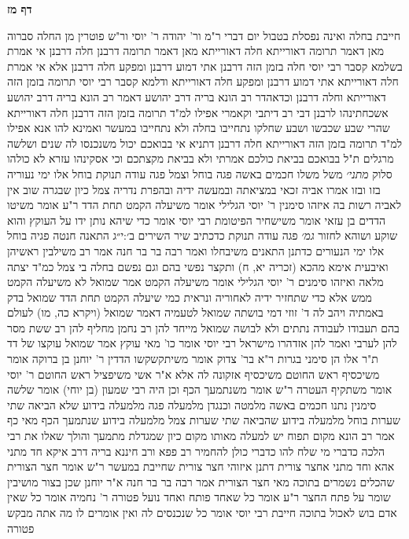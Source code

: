 \documentclass[12pt, openany]{book}
\newcommand{\sethebfont}{
\fontsize{10.5pt}{21.0pt} \selectfont
}
\newcommand{\twocol}[1]{
	{\sethebfont \begin{multicols}{2}
			#1
	\end{multicols}}	
}
\newcommand{\sectname}{}
\newcommand{\newsection}[1]{
	\addcontentsline{toc}{section}{#1}
	\renewcommand{\sectname}{#1}	
	\vspace{-\baselineskip}
	\begin{center}
		\textbf{%
\fontsize{16pt}{16pt}\selectfont
			#1}
	\end{center}
	\vspace{-\baselineskip}
	\nopagebreak
}
\begin{document}
\newsection{דף מז}
\twocol{חייבת בחלה ואינה נפסלת בטבול יום דברי ר"מ ור' יהודה ר' יוסי ור"ש פוטרין מן החלה 
סברוה מאן דאמר תרומה דאורייתא חלה דאורייתא מאן דאמר תרומה דרבנן חלה דרבנן אי אמרת בשלמא קסבר רבי יוסי חלה בזמן הזה דרבנן אתי דמוע דרבנן ומפקע חלה דרבנן 
אלא אי אמרת חלה דאורייתא אתי דמוע דרבנן ומפקע חלה דאורייתא 
ודלמא קסבר רבי יוסי תרומה בזמן הזה דאורייתא וחלה דרבנן 
וכדאהדר רב הונא בריה דרב יהושע דאמר רב הונא בריה דרב יהושע אשכחתינהו לרבנן דבי רב דיתבי וקאמרי אפילו למ"ד תרומה בזמן הזה דרבנן חלה דאורייתא
שהרי שבע שכבשו ושבע שחלקו נתחייבו בחלה ולא נתחייבו במעשר 
ואמינא להו אנא אפילו למ"ד תרומה בזמן הזה דאורייתא חלה דרבנן דתניא אי בבואכם יכול משנכנסו לה שנים ושלשה מרגלים ת"ל בבואכם בביאת כולכם אמרתי ולא בביאת מקצתכם
וכי אסקינהו עזרא לא כולהו סלוק
{\large\emph{מתני׳}} משל משלו חכמים באשה פגה בוחל וצמל פגה עודה תנוקת בוחל אלו ימי נעוריה
בזו ובזו אמרו אביה זכאי במציאתה ובמעשה ידיה ובהפרת נדריה צמל כיון שבגרה שוב אין לאביה רשות בה 
איזהו סימנין ר' יוסי הגלילי אומר משיעלה הקמט תחת הדד ר"ע אומר משיטו הדדים בן עזאי אומר משישחיר הפיטומת רבי יוסי אומר כדי שיהא נותן ידו על העוקץ והוא שוקע ושוהא לחזור
{\large\emph{גמ׳}} פגה עודה תנוקת כדכתיב {שיר השירים ב׳:י״ג } התאנה חנטה פגיה בוחל אלו ימי הנעורים כדתנן התאנים משיבחלו ואמר רבה בר בר חנה אמר רב משילבין ראשיהן 
ואיבעית אימא מהכא (זכריה יא, ח) ותקצר נפשי בהם וגם נפשם בחלה בי צמל כמ"ד יצתה מלאה
ואיזהו סימנים ר' יוסי הגלילי אומר משיעלה הקמט אמר שמואל לא משיעלה הקמט ממש אלא כדי שתחזיר ידיה לאחוריה ונראית כמי שיעלה הקמט תחת הדד 
שמואל בדק באמתיה ויהב לה ד' זוזי דמי בושתה שמואל לטעמיה דאמר שמואל (ויקרא כה, מו) לעולם בהם תעבודו לעבודה נתתים ולא לבושה 
שמואל מייחד להן רב נחמן מחליף להן רב ששת מסר להן לערבי ואמר להן אזדהרו מישראל
רבי יוסי אומר כו' מאי עוקץ אמר שמואל עוקצו של דד 
ת"ר אלו הן סימני בגרות ר"א בר' צדוק אומר משיתקשקשו הדדין ר' יוחנן בן ברוקה אומר משיכסיף ראש החוטם משיכסיף אזקונה לה אלא א"ר אשי משיפציל ראש החוטם ר' יוסי אומר משתקיף העטרה ר"ש אומר משנתמעך
הכף 
וכן היה רבי שמעון (בן יוחי) אומר שלשה סימנין נתנו חכמים באשה מלמטה וכנגדן מלמעלה פגה מלמעלה בידוע שלא הביאה שתי שערות בוחל מלמעלה בידוע שהביאה שתי שערות צמל מלמעלה בידוע שנתמעך הכף 
מאי כף אמר רב הונא מקום תפוח יש למעלה מאותו מקום כיון שמגדלת מתמעך והולך שאלו את רבי הלכה כדברי מי שלח להו כדברי כולן להחמיר 
רב פפא ורב חיננא בריה דרב איקא חד מתני אהא וחד מתני אחצר צורית דתנן איזוהי חצר צורית שחייבת במעשר ר"ש אומר חצר הצורית שהכלים נשמרים בתוכה 
מאי חצר הצורית אמר רבה בר בר חנה א"ר יוחנן שכן בצור מושיבין שומר על פתח החצר ר"ע אומר כל שאחד פותח ואחד נועל פטורה 
ר' נחמיה אומר כל שאין אדם בוש לאכול בתוכה חייבת רבי יוסי אומר כל שנכנסים לה ואין אומרים לו מה אתה מבקש פטורה 
}
\end{document}
